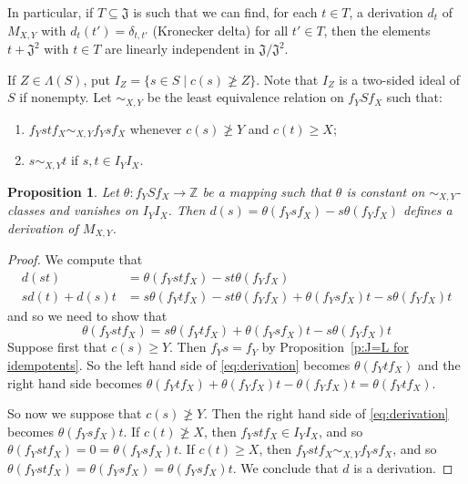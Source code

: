 \documentclass[reqno,11pt]{amsart}
\newtheorem{Prop}[Thm]{Proposition}
\numberwithin{equation}{section}
\begin{document}
In particular, if $T\subseteq \mathfrak J$ is such that we can find, for each $t\in T$, a derivation $d_t$ of $M_{X,Y}$ with $d_t(t')=\delta_{t,t'}$ (Kronecker delta) for all $t'\in T$, then the elements $t+\mathfrak J^2$ with $t\in T$ are linearly independent in $\mathfrak J/\mathfrak J^2$.


If $Z\in \Lambda(S)$, put $I_Z=\{s\in S\mid c(s)\ngeq Z\}$.  Note that $I_Z$ is a two-sided ideal of $S$ if nonempty.
Let $\sim_{X,Y}$ be the least equivalence relation on $f_YSf_X$ such that:
\begin{enumerate}
    \item $f_Ystf_X\sim_{X,Y} f_Ysf_X$ whenever $c(s)\ngeq Y$ and $c(t)\geq X$;
    \item $s\sim_{X,Y}t$ if $s,t\in I_YI_X$.
\end{enumerate}

\begin{Prop}\label{p:derivation.from.theta}
    Let $\theta\colon f_YSf_X\to \mathbb Z$ be a mapping such that $\theta$ is constant on $\sim_{X,Y}$-classes and vanishes on $I_YI_X$.  Then $d(s) = \theta(f_Ysf_X)-s\theta(f_Yf_X)$ defines a derivation of $M_{X,Y}$.
\end{Prop}
\begin{proof}
We compute that
\begin{align*}
    d(st) &= \theta(f_Ystf_X)- st\theta(f_Yf_X)\\
    sd(t)+d(s)t &= s\theta(f_Ytf_X)-st\theta(f_Yf_X)+\theta(f_Ysf_X)t-s\theta(f_Yf_X)t
\end{align*}
and so we need to show that 
\begin{equation}\label{eq:derivation}
\theta(f_Ystf_X) = s\theta(f_Ytf_X)+\theta(f_Ysf_X)t-s\theta(f_Yf_X)t
\end{equation}
Suppose first that $c(s)\geq Y$.   Then $f_Ys=f_Y$ by Proposition~\ref{p:J=L for idempotents}.  So the left hand side of \eqref{eq:derivation} becomes $\theta(f_Ytf_X)$ and the right hand side becomes $\theta(f_Ytf_X)+\theta(f_Yf_X)t - \theta (f_Yf_X)t= \theta(f_Ytf_X)$.  

So now we suppose that $c(s)\ngeq Y$.  Then the right hand side of \eqref{eq:derivation} becomes $\theta(f_Ysf_X)t$.  If $c(t)\ngeq X$, then $f_Ystf_X\in I_YI_X$, and so $\theta(f_Ystf_X)=0=\theta(f_Ysf_X)t$.  If $c(t)\geq X$, then $f_Ystf_X\sim_{X,Y} f_Ysf_X$, and so $\theta(f_Ystf_X) = \theta(f_Ysf_X) =  \theta(f_Ysf_X)t$.   We conclude that $d$ is a derivation.
\end{proof}
\end{document}
